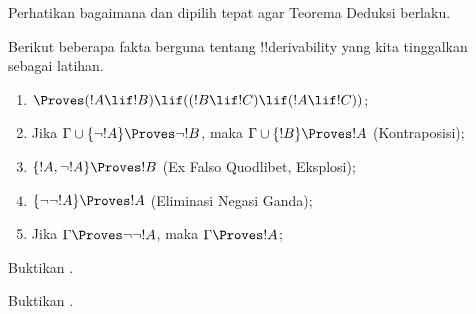 \documentclass[../../../include/open-logic-section]{subfiles}
\begin{document}
Perhatikan bagaimana  dan 
dipilih tepat agar Teorema Deduksi berlaku.

Berikut beberapa fakta berguna tentang !!{derivability} yang kita
tinggalkan sebagai latihan.

\begin{prop}
\begin{enumerate}
\item $\Proves (!A \lif !B) \lif ((!B \lif !C)
  \lif (!A \lif !C))$; 
\item Jika $\Gamma \cup \{ \lnot !A\}
  \Proves \lnot !B$, maka $\Gamma \cup \{ !B\} \Proves
  !A$ (Kontraposisi); 
\item $\{ !A, \lnot!A\} \Proves
    !B$ (Ex Falso Quodlibet, Eksplosi); 
\item $\{ \lnot\lnot!A\} \Proves
  !A$ (Eliminasi Negasi Ganda);
\item Jika $\Gamma \Proves \lnot\lnot!A$, maka $\Gamma \Proves
  !A$;
\end{enumerate}
\end{prop}

\begin{prob}
  Buktikan .
\end{prob}
\tagendprob

\begin{prob}
  Buktikan .
\end{prob}
\tagendprob
\end{document}
